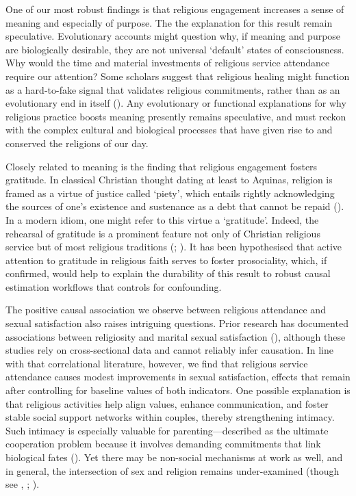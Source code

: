 \documentclass[
  single column]{article}
\begin{document}
One of our most robust findings is that religious engagement increases a
sense of meaning and especially of purpose. The the explanation for this
result remain speculative. Evolutionary accounts might question why, if
meaning and purpose are biologically desirable, they are not universal
`default' states of consciousness. Why would the time and material
investments of religious service attendance require our attention? Some
scholars suggest that religious healing might function as a hard-to-fake
signal that validates religious commitments, rather than as an
evolutionary end in itself (). Any evolutionary or functional explanations for why religious
practice boosts meaning presently remains speculative, and must reckon
with the complex cultural and biological processes that have given rise
to and conserved the religions of our day.

Closely related to meaning is the finding that religious engagement
fosters gratitude. In classical Christian thought dating at least to
Aquinas, religion is framed as a virtue of justice called `piety', which
entails rightly acknowledging the sources of one's existence and
sustenance as a debt that cannot be repaid
(). In a modern
idiom, one might refer to this virtue a `gratitude'. Indeed, the
rehearsal of gratitude is a prominent feature not only of Christian
religious service but of most religious traditions
(;
).
It has been hypothesised that active attention to gratitude in religious
faith serves to foster prosociality, which, if confirmed, would help to
explain the durability of this result to robust causal estimation
workflows that controls for confounding.

The positive causal association we observe between religious attendance
and sexual satisfaction also raises intriguing questions. Prior research
has documented associations between religiosity and marital sexual
satisfaction (),
although these studies rely on cross-sectional data and cannot reliably
infer causation. In line with that correlational literature, however, we
find that religious service attendance causes modest improvements in
sexual satisfaction, effects that remain after controlling for baseline
values of both indicators. One possible explanation is that religious
activities help align values, enhance communication, and foster stable
social support networks within couples, thereby strengthening intimacy.
Such intimacy is especially valuable for parenting---described as the
ultimate cooperation problem because it involves demanding commitments
that link biological fates
(). Yet there may be
non-social mechanisms at work as well, and in general, the intersection
of sex and religion remains under-examined (though see
,
;
).
\end{document}

